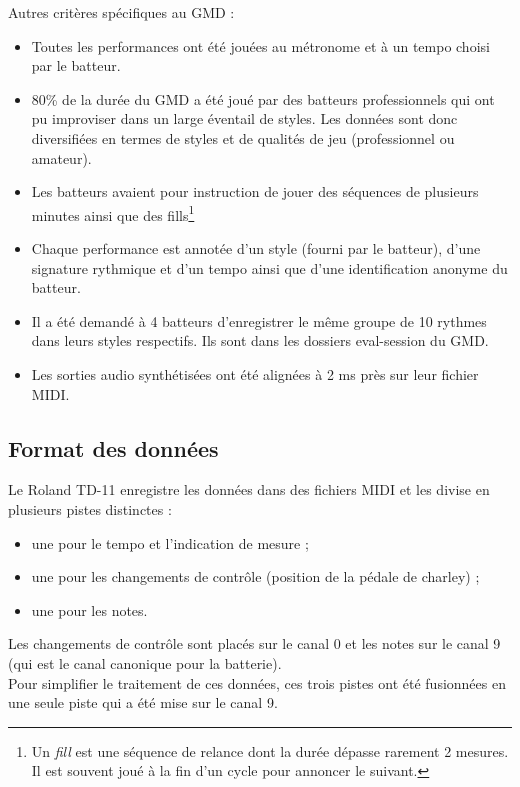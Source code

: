 Autres critères spécifiques au GMD :
\begin{itemize}
	\item Toutes les performances ont été jouées au métronome et à un tempo
        choisi par le batteur.
	\item 80\% de la durée du GMD a été joué par des batteurs professionnels
        qui ont pu improviser dans un large éventail de styles. Les données
        sont donc diversifiées en termes de styles et de qualités de jeu
        (professionnel ou amateur).
	\item Les batteurs avaient pour instruction de jouer des séquences de
        plusieurs minutes ainsi que des fills\footnote{Un \textit{fill} est une
        séquence de relance dont la durée dépasse rarement 2 mesures. Il est
        souvent joué à la fin d’un cycle pour annoncer le suivant.}
	\item Chaque performance est annotée d’un style (fourni par le batteur),
        d’une signature rythmique et d’un tempo ainsi que d’une identification
        anonyme du batteur.
	\item Il a été demandé à 4 batteurs d’enregistrer le même groupe de 10
        rythmes dans leurs styles respectifs. Ils sont dans les dossiers
        eval-session du GMD.
	\item Les sorties audio synthétisées ont été alignées à 2 ms près sur leur
        fichier MIDI.
\end{itemize}

\subsection*{Format des données}
Le Roland TD-11 enregistre les données dans des fichiers MIDI et les divise en
plusieurs pistes distinctes :
\begin{itemize}
	\item une pour le tempo et l’indication de mesure ;
	\item une pour les changements de contrôle (position de la pédale de
        charley) ;
	\item une pour les notes.\\
\end{itemize}
Les changements de contrôle sont placés sur le canal 0 et les notes sur le
canal 9 (qui est le canal canonique pour la batterie).\\
Pour simplifier le traitement de ces données, ces trois pistes ont été
fusionnées en une seule piste qui a été mise sur le canal 9.

